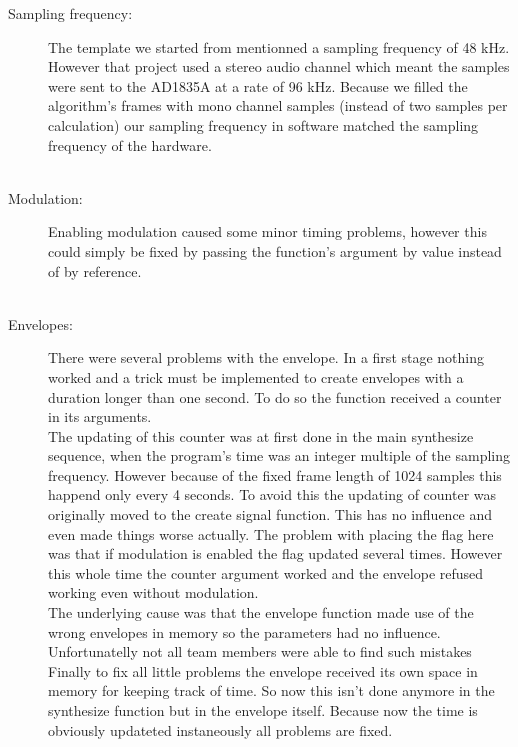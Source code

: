 \begin{description}
\item[Sampling frequency:] The template we started from mentionned a sampling frequency of 48 kHz. However that project used a stereo audio channel which meant the samples were sent to the AD1835A at a rate of 96 kHz. Because we filled the algorithm's frames with mono channel samples (instead of two samples per calculation) our sampling frequency in software matched the sampling frequency of the hardware. \\ \\
\item[Modulation:] Enabling modulation caused some minor timing problems, however this could simply be fixed by passing the function's argument by value instead of by reference. \\ \\
\item[Envelopes:] There were several problems with the envelope. In a first stage nothing worked and a trick must be implemented to create envelopes with a duration longer than one second. To do so the function received a counter in its arguments. \\
The updating of this counter was at first done in the main synthesize sequence, when the program's time was an integer multiple of the sampling frequency. However because of the fixed frame length of 1024 samples this happend only every 4 seconds. To avoid this the updating of counter was originally moved to the create signal function. This has no influence and even made things worse actually. The problem with placing the flag here was that if modulation is enabled the flag updated several times. However this whole time the counter argument worked and the envelope refused working even without modulation.\\The underlying cause was that the envelope function made use of the wrong envelopes in memory so the parameters had no influence. Unfortunatelly not all team members were able to find such mistakes\\
Finally to fix all little problems the envelope received its own space in memory for keeping track of time. So now this isn't done anymore in the synthesize function but in the envelope itself. Because now the time is obviously updateted instaneously all problems are fixed. 
\end{description}
